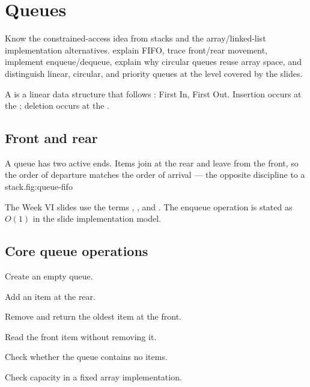 \chapter{Queues}\label{ch:queues}

\chapterguide%
  {Know the constrained-access idea from stacks and the array/linked-list implementation alternatives.}
  {explain FIFO, trace front/rear movement, implement enqueue/dequeue, explain why circular queues reuse array space, and distinguish linear, circular, and priority queues at the level covered by the slides.}

A  is a linear data structure that follows : First In, First Out. Insertion occurs at the ; deletion occurs at the .

\section{Front and rear}

\begin{adsfig}{A queue has two active ends. Items join at the rear and leave from the
front, so the order of departure matches the order of arrival --- the opposite discipline
to a stack.}{fig:queue-fifo}
\end{adsfig}

The Week VI slides use the terms , , and . The enqueue operation is stated as $O(1)$ in the slide implementation model.

\section{Core queue operations}

\begin{description}[leftmargin=1.3in,style=nextline]
  \item[Create Q] Create an empty queue.
  \item[enqueue()] Add an item at the rear.
  \item[dequeue()] Remove and return the oldest item at the front.
  \item[peek/front] Read the front item without removing it.
  \item[isEmpty()] Check whether the queue contains no items.
  \item[isFull()] Check capacity in a fixed array implementation.
\end{description}

